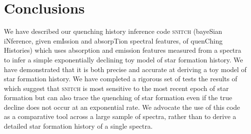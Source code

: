 \documentclass[useAMS,usenatbib]{mn2e}
\begin{document}


\section{Conclusions}

We have described our quenching history inference code \textsc{snitch} (bayeSian iNference, given emIssion and absorpTion spectral features, of quenChing Histories) which uses absorption and emission features measured from a spectra to infer a simple exponentially declining toy model of star formation history. We have demonstrated that it is both precise and accurate at deriving a toy model of star formation history. We have completed a rigorous set of tests the results of which suggest that \textsc{snitch} is most sensitive to the most recent epoch of star formation but can also trace the quenching of star formation even if the true decline does not occur at an exponential rate.  We advocate the use of this code as a comparative tool across a large sample of spectra, rather than to derive a detailed star formation history of a single spectra. 


  
\end{document}
